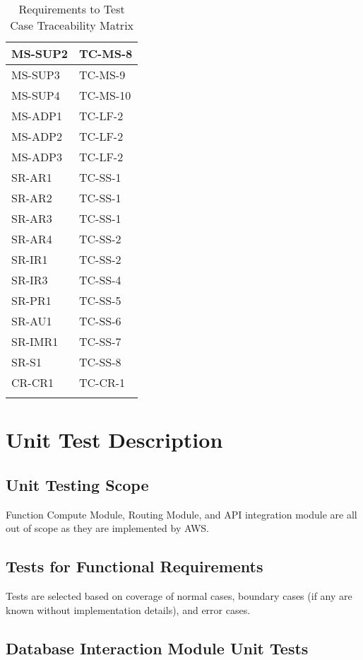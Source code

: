 \documentclass[12pt, titlepage]{article}
\begin{document}
\begin{longtable}{|l|l|}
  MS-SUP2 & TC-MS-8 \\ \hline
  MS-SUP3 & TC-MS-9 \\ \hline
  MS-SUP4 & TC-MS-10 \\ \hline
  MS-ADP1 & TC-LF-2 \\ \hline
  MS-ADP2 & TC-LF-2 \\ \hline
  MS-ADP3 & TC-LF-2 \\ \hline
  SR-AR1 & TC-SS-1 \\ \hline
  SR-AR2 & TC-SS-1 \\ \hline
  SR-AR3 & TC-SS-1 \\ \hline
  SR-AR4 & TC-SS-2 \\ \hline
  SR-IR1 & TC-SS-2 \\ \hline
  SR-IR3 & TC-SS-4 \\ \hline
  SR-PR1 & TC-SS-5\\ \hline
  SR-AU1 & TC-SS-6 \\ \hline
  SR-IMR1 & TC-SS-7 \\ \hline
  SR-S1 & TC-SS-8 \\ \hline
  CR-CR1 & TC-CR-1 \\ \hline
  \caption{Requirements to Test Case Traceability Matrix}
\end{longtable}

\section{Unit Test Description}

\subsection{Unit Testing Scope}

Function Compute Module, Routing Module, and API integration module are all
out of scope as they are implemented by AWS.

\subsection{Tests for Functional Requirements}

Tests are selected based on coverage of normal cases, boundary cases
(if any are known without implementation details), and error cases.

\subsection{Database Interaction Module Unit Tests}
\end{document}

